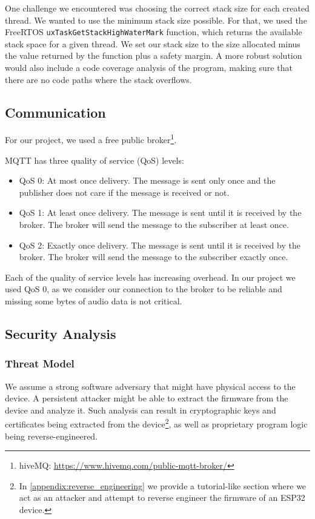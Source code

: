 \documentclass[conference]{IEEEtran}
\begin{document}
One challenge we encountered was choosing the correct stack size for each created thread.
We wanted to use the minimum stack size possible.
For that, we used the FreeRTOS \texttt{uxTaskGetStackHighWaterMark} function, which returns
the available stack space for a given thread.
We set our stack size to the size allocated minus the value returned by the function plus a safety margin.
A more robust solution would also include a code coverage analysis\cite{CodeCoverage} of the program,
making sure that there are no code paths where the stack overflows.

\subsection{Communication}

For our project, we used a free public broker\footnote{hiveMQ: \url{https://www.hivemq.com/public-mqtt-broker/}}.

MQTT has three quality of service (QoS) levels:

\begin{itemize}
    \item QoS 0: At most once delivery. The message is sent only once and the publisher does not care if the message is received or not.
    \item QoS 1: At least once delivery. The message is sent until it is received by the broker. The broker will send the message to the subscriber at least once.
    \item QoS 2: Exactly once delivery. The message is sent until it is received by the broker. The broker will send the message to the subscriber exactly once.
\end{itemize}

Each of the quality of service levels has increasing overhead. In our project
we used QoS 0, as we consider our connection to the broker to be reliable 
and missing some bytes of audio data is not critical.

\subsection{Security Analysis}
\label{subsec:security_analysis}


\subsubsection{Threat Model}

We assume a strong software adversary that might have physical access to the device.
A persistent attacker might be able to extract the firmware from the device and
analyze it. Such analysis can result in cryptographic keys and certificates being extracted from the device\footnote{In \cref{appendix:reverse_engineering} we provide a tutorial-like section where we act as an attacker and attempt to reverse engineer the firmware of an ESP32 device.}, 
as well as proprietary program logic being reverse-engineered.
\end{document}
